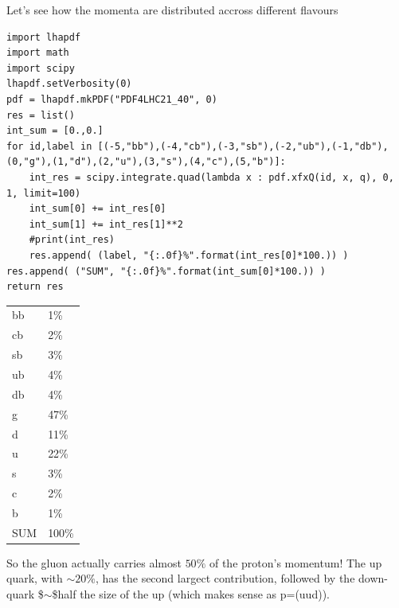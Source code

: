 \documentclass[11pt]{article}
\begin{document}
Let's see how the momenta are distributed accross different flavours
\begin{verbatim}
import lhapdf
import math
import scipy
lhapdf.setVerbosity(0)
pdf = lhapdf.mkPDF("PDF4LHC21_40", 0)
res = list()
int_sum = [0.,0.]
for id,label in [(-5,"bb"),(-4,"cb"),(-3,"sb"),(-2,"ub"),(-1,"db"),(0,"g"),(1,"d"),(2,"u"),(3,"s"),(4,"c"),(5,"b")]:
    int_res = scipy.integrate.quad(lambda x : pdf.xfxQ(id, x, q), 0, 1, limit=100)
    int_sum[0] += int_res[0]
    int_sum[1] += int_res[1]**2
    #print(int_res)
    res.append( (label, "{:.0f}%".format(int_res[0]*100.)) )
res.append( ("SUM", "{:.0f}%".format(int_sum[0]*100.)) )
return res
\end{verbatim}

\begin{center}
\begin{tabular}{ll}
bb & 1\%\\[0pt]
cb & 2\%\\[0pt]
sb & 3\%\\[0pt]
ub & 4\%\\[0pt]
db & 4\%\\[0pt]
g & 47\%\\[0pt]
d & 11\%\\[0pt]
u & 22\%\\[0pt]
s & 3\%\\[0pt]
c & 2\%\\[0pt]
b & 1\%\\[0pt]
SUM & 100\%\\[0pt]
\end{tabular}
\end{center}

So the gluon actually carries almost \(50\%\) of the proton's momentum!
The up quark, with \(\sim20\%\), has the second largect contribution, followed by the down-quark \$\(\sim\)\$half the size of the up (which makes sense as p=(uud)).
\end{document}
